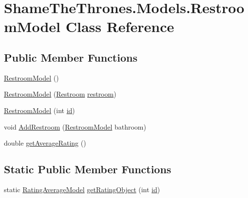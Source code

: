 \hypertarget{class_shame_the_thrones_1_1_models_1_1_restroom_model}{}\section{Shame\+The\+Thrones.\+Models.\+Restroom\+Model Class Reference}
\label{class_shame_the_thrones_1_1_models_1_1_restroom_model}
\subsection*{Public Member Functions}
\begin{DoxyCompactItemize}
\item 
\hyperlink{class_shame_the_thrones_1_1_models_1_1_restroom_model_a687b51922172de57fed693d9afb04e45}{Restroom\+Model} ()
\item 
\hyperlink{class_shame_the_thrones_1_1_models_1_1_restroom_model_a22e553def11a89d809242c83beb00550}{Restroom\+Model} (\hyperlink{class_shame_the_thrones_1_1_models_1_1_db_context_1_1_restroom}{Restroom} \hyperlink{typescriptcombined_8js_a6f245fd3da421ab8da36b2973e8a3bd4}{restroom})
\item 
\hyperlink{class_shame_the_thrones_1_1_models_1_1_restroom_model_afc420fd2fc5dd0719cbe3bf349a73678}{Restroom\+Model} (int \hyperlink{class_shame_the_thrones_1_1_models_1_1_restroom_model_aa40cb126c8e366c08de4764b232613ce}{id})
\item 
void \hyperlink{class_shame_the_thrones_1_1_models_1_1_restroom_model_a2d185959128d4ace8bae84cff8fe4363}{Add\+Restroom} (\hyperlink{class_shame_the_thrones_1_1_models_1_1_restroom_model}{Restroom\+Model} bathroom)
\item 
double \hyperlink{class_shame_the_thrones_1_1_models_1_1_restroom_model_a595556ac01efdda0362abe6a375be6ba}{get\+Average\+Rating} ()
\end{DoxyCompactItemize}
\subsection*{Static Public Member Functions}
\begin{DoxyCompactItemize}
\item 
static \hyperlink{class_shame_the_thrones_1_1_models_1_1_rating_average_model}{Rating\+Average\+Model} \hyperlink{class_shame_the_thrones_1_1_models_1_1_restroom_model_ab67708aa2546c81e3286990ffa604441}{get\+Rating\+Object} (int \hyperlink{class_shame_the_thrones_1_1_models_1_1_restroom_model_aa40cb126c8e366c08de4764b232613ce}{id})
\end{DoxyCompactItemize}
